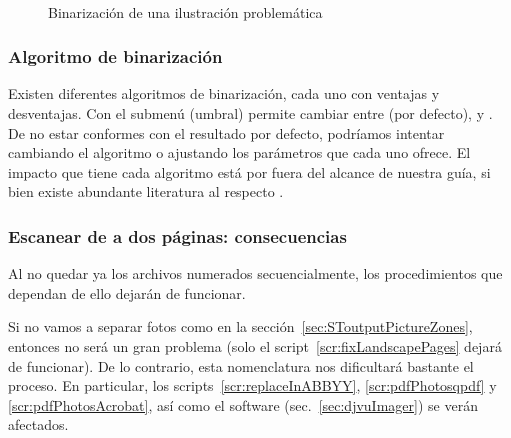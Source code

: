 \documentclass[%
	a5paper,
	10pt,
	twoside,
	openright,
	final,
]{memoir}
\begin{document}
{	\begin{figure}
		\hspace*{\fill}
		\hfill
		\hspace*{\fill}\\
		\hspace*{\fill}
		\hfill
		\hspace*{\fill}
		\caption{Binarización de una ilustración problemática\label{fig:SToutputBadDiagrams}}
	\end{figure}

	\subsubsection{Algoritmo de binarización} Existen diferentes algoritmos de binarización, cada uno con ventajas y desventajas. Con el submenú  (umbral) \scantailorAdvanced permite cambiar entre  (por defecto),  y . De no estar conformes con el resultado por defecto, podríamos intentar cambiando el algoritmo o ajustando los parámetros que cada uno ofrece. El impacto que tiene cada algoritmo está por fuera del alcance de nuestra guía, si bien existe abundante literatura al respecto \cite{RashmiBinarization}.

	\subsubsection{Escanear de a dos páginas: consecuencias\label{sec:scanningTwoPages}} Al no quedar ya los archivos numerados secuencialmente, los procedimientos que dependan de ello dejarán de funcionar.

	Si no vamos a separar fotos como en la sección~\ref{sec:SToutputPictureZones}, entonces no será un gran problema (solo el script~\ref{scr:fixLandscapePages} dejará de funcionar). De lo contrario, esta nomenclatura nos dificultará bastante el proceso. En particular, los scripts~\ref{scr:replaceInABBYY}, \ref{scr:pdfPhotosqpdf} y \ref{scr:pdfPhotosAcrobat}, así como el software \djvuimager (sec.~\ref{sec:djvuImager}) se verán afectados.

}
\end{document}

